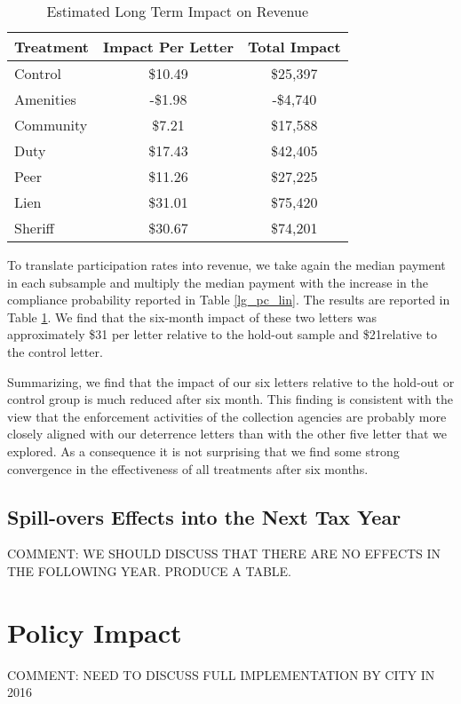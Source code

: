 \documentclass[12pt]{article}
\begin{document}
\begin{table}[htbp]
\caption{Estimated Long Term Impact on Revenue} \label{lg_rev}
\bigskip
\centering
\begin{tabular}{l c c}
\hline
Treatment & Impact Per Letter & Total Impact \\ 
\hline
Control & \$10.49 & \$25,397 \\ 
Amenities & -\$1.98 & -\$4,740 \\ 
Community & \$7.21 & \$17,588 \\ 
Duty & \$17.43 & \$42,405 \\ 
Peer & \$11.26 & \$27,225 \\ 
Lien & \$31.01 & \$75,420 \\ 
Sheriff & \$30.67 & \$74,201 \\ 
\hline
\end{tabular}
\end{table}

To translate participation rates into revenue, we take again the
median payment in each subsample and multiply the median payment with
the increase in the compliance probability reported in Table
\ref{lg_pc_lin}.  The results are reported in Table \ref{lg_rev}. We
find that the six-month impact of these two letters was approximately
\$31 per letter relative to the hold-out sample and \$21relative to
the control letter.

Summarizing, we find that the impact of our six letters relative to
the hold-out or control group is much reduced after six month. This
finding is consistent with the view that the enforcement activities of
the collection agencies are probably more closely aligned with our
deterrence letters than with the other five letter that we
explored. As a consequence it is not surprising that we find some
strong convergence in the effectiveness of all treatments after six
months.

\subsection{Spill-overs Effects into the Next Tax Year}

\noindent COMMENT: WE SHOULD DISCUSS THAT THERE ARE NO EFFECTS IN THE
FOLLOWING YEAR. PRODUCE A TABLE.

\section{Policy Impact}

\noindent COMMENT: NEED TO DISCUSS FULL IMPLEMENTATION BY CITY IN 2016
\end{document}
